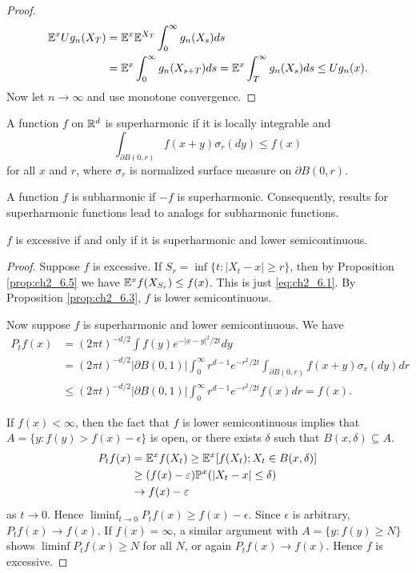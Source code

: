 \begin{proof}
\begin{align*}
    \mathbb{E}^xUg_n(X_T) &= \mathbb{E}^x\mathbb{E}^{X_T}\int_0^\infty g_n(X_s)ds \\
    &= \mathbb{E}^x\int_0^\infty g_n(X_{s+T})ds = \mathbb{E}^x\int_T^\infty g_n(X_s)ds \leq Ug_n(x).
\end{align*}
\mnewpage
Now let $n \to \infty$ and use monotone convergence.
\end{proof}

\begin{definition}\label{def:ch2_6.6}
A function $f$ on $\mathbb{R}^d$ is superharmonic if it is locally integrable and
\begin{equation}\label{eq:ch2_6.1}
    \int_{\partial B(0,r)} f(x+y)\sigma_r(dy) \leq f(x)
\end{equation}
for all $x$ and $r$, where $\sigma_r$ is normalized surface measure on $\partial B(0,r)$.
\end{definition}

A function $f$ is subharmonic if $-f$ is superharmonic. Consequently,
results for superharmonic functions lead to analogs for subharmonic functions.

\begin{proposition}\label{prop:ch2_6.7}
$f$ is excessive if and only if it is superharmonic and lower semicontinuous.
\end{proposition}

\begin{proof}
Suppose $f$ is excessive. If $S_r = \inf\{t : |X_t - x| \geq r\}$, then by Proposition \ref{prop:ch2_6.5} we have $\mathbb{E}^xf(X_{S_r}) \leq f(x)$. This is just \eqref{eq:ch2_6.1}. By Proposition \ref{prop:ch2_6.3}, $f$ is lower semicontinuous.

Now suppose $f$ is superharmonic and lower semicontinuous. We have
\begin{align*}
    P_tf(x) &= (2\pi t)^{-d/2}\int f(y)e^{-|x-y|^2/2t}dy \\
    &= (2\pi t)^{-d/2}|\partial B(0,1)|\int_0^\infty r^{d-1}e^{-r^2/2t}\int_{\partial B(0,r)} f(x+y)\sigma_r(dy)dr \\
    &\leq (2\pi t)^{-d/2}|\partial B(0,1)|\int_0^\infty r^{d-1}e^{-r^2/2t}f(x)dr = f(x).
\end{align*}

If $f(x) < \infty$, then the fact that $f$ is lower semicontinuous implies that
$A = \{y : f(y) > f(x) - \epsilon\}$ is open, or there exists $\delta$ such that $B(x,\delta) \subseteq A$.
\begin{align*}
    P_tf(x) &= \mathbb{E}^xf(X_t) \geq \mathbb{E}^x[f(X_t); X_t \in B(x,\delta)] \\
    &\geq (f(x) - \varepsilon)\mathbb{P}^x(|X_t - x| \leq \delta) \\
    &\to f(x) - \varepsilon
\end{align*}
as $t \to 0$. Hence $\liminf_{t\to0} P_tf(x) \geq f(x)-\epsilon$. Since $\epsilon$ is arbitrary, $P_tf(x) \to f(x)$. If $f(x) = \infty$, a similar argument with $A = \{y : f(y) \geq N\}$ shows $\liminf P_tf(x) \geq N$ for all $N$, or again $P_tf(x) \to f(x)$. Hence $f$ is excessive.
\end{proof}


